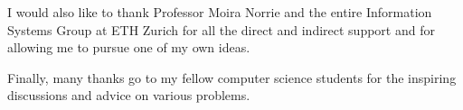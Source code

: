 \documentclass[11pt,a4paper]{globis-book}
\begin{document}
I would also like to thank Professor Moira Norrie and the entire Information Systems Group at ETH Zurich for all the direct and indirect support and for allowing me to pursue one of my own ideas.

Finally, many thanks go to my fellow computer science students for the inspiring discussions and advice on various problems.

\newpage
\thispagestyle{empty}



\end{document}
